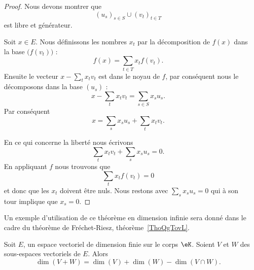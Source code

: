 \begin{proof}
	Nous devons montrer que
	\begin{equation}
		(u_s)_{s\in S}\cup (v_t)_{t\in T}
	\end{equation}
	est libre et générateur.

	Soit \( x\in E\). Nous définissons les nombres \( x_t\) par la décomposition de \( f(x)\) dans la base \( \big( f(v_t) \big)\) :
	\begin{equation}
		f(x)=\sum_{t\in T}x_tf(v_t).
	\end{equation}
	Ensuite le vecteur \( x-\sum_tx_tv_t\) est dans le noyau de \( f\), par conséquent nous le décomposons dans la base \( (u_s)\) :
	\begin{equation}
		x-\sum_tx_tv_t=\sum_{s\in S} x_su_s.
	\end{equation}
	Par conséquent
	\begin{equation}
		x=\sum_sx_su_s+\sum_tx_tv_t.
	\end{equation}

	En ce qui concerne la liberté nous écrivons
	\begin{equation}
		\sum_tx_tv_t+\sum_sx_su_s=0.
	\end{equation}
	En appliquant \( f\) nous trouvons que
	\begin{equation}
		\sum_tx_tf(v_t)=0
	\end{equation}
	et donc que les \( x_t\) doivent être nuls. Nous restons avec \( \sum_sx_su_s=0\) qui à son tour implique que \( x_s=0\).
\end{proof}
Un exemple d'utilisation de ce théorème en dimension infinie sera donné dans le cadre du théorème de Fréchet-Riesz, théorème~\ref{ThoQgTovL}.

\begin{proposition}      \label{PROPooQCIXooHIyPPq}
	Soit \( E\), un espace vectoriel de dimension finie sur le corps \( \eK\). Soient \( V\) et \( W\) des sous-espaces vectoriels de \( E\). Alors
	\begin{equation}
		\dim(V+W)=\dim(V)+\dim(W)-\dim(V\cap W).
	\end{equation}
\end{proposition}

